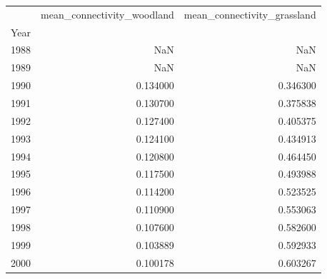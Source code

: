 \begin{tabular}{lrr}
\toprule
 & mean_connectivity_woodland & mean_connectivity_grassland \\
Year &  &  \\
\midrule
1988 & NaN & NaN \\
1989 & NaN & NaN \\
1990 & 0.134000 & 0.346300 \\
1991 & 0.130700 & 0.375838 \\
1992 & 0.127400 & 0.405375 \\
1993 & 0.124100 & 0.434913 \\
1994 & 0.120800 & 0.464450 \\
1995 & 0.117500 & 0.493988 \\
1996 & 0.114200 & 0.523525 \\
1997 & 0.110900 & 0.553063 \\
1998 & 0.107600 & 0.582600 \\
1999 & 0.103889 & 0.592933 \\
2000 & 0.100178 & 0.603267 \\
\bottomrule
\end{tabular}
